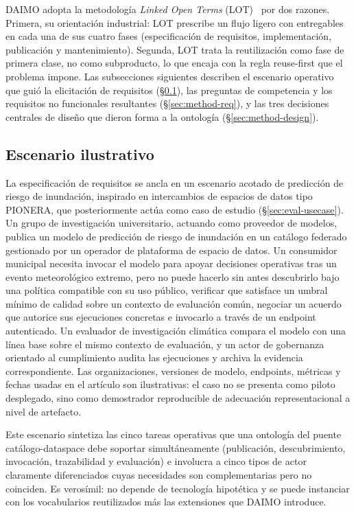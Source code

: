 \documentclass[Afour,sagev,times]{sagej}
\begin{document}
DAIMO adopta la metodología \emph{Linked Open Terms} (LOT)~\cite{lot22} por dos razones. Primera, su orientación industrial: LOT prescribe un flujo ligero con entregables en cada una de sus cuatro fases (especificación de requisitos, implementación, publicación y mantenimiento). Segunda, LOT trata la reutilización como fase de primera clase, no como subproducto, lo que encaja con la regla reuse-first que el problema impone. Las subsecciones siguientes describen el escenario operativo que guió la elicitación de requisitos (§\ref{sec:scenario}), las preguntas de competencia y los requisitos no funcionales resultantes (§\ref{sec:method-req}), y las tres decisiones centrales de diseño que dieron forma a la ontología (§\ref{sec:method-design}).

\subsection{Escenario ilustrativo}\label{sec:scenario}

La especificación de requisitos se ancla en un escenario acotado de predicción de riesgo de inundación, inspirado en intercambios de espacios de datos tipo PIONERA, que posteriormente actúa como caso de estudio (§\ref{sec:eval-usecase}). Un grupo de investigación universitario, actuando como proveedor de modelos, publica un modelo de predicción de riesgo de inundación en un catálogo federado gestionado por un operador de plataforma de espacio de datos. Un consumidor municipal necesita invocar el modelo para apoyar decisiones operativas tras un evento meteorológico extremo, pero no puede hacerlo sin antes descubrirlo bajo una política compatible con su uso público, verificar que satisface un umbral mínimo de calidad sobre un contexto de evaluación común, negociar un acuerdo que autorice sus ejecuciones concretas e invocarlo a través de un endpoint autenticado. Un evaluador de investigación climática compara el modelo con una línea base sobre el mismo contexto de evaluación, y un actor de gobernanza orientado al cumplimiento audita las ejecuciones y archiva la evidencia correspondiente. Las organizaciones, versiones de modelo, endpoints, métricas y fechas usadas en el artículo son ilustrativas: el caso no se presenta como piloto desplegado, sino como demostrador reproducible de adecuación representacional a nivel de artefacto.

Este escenario sintetiza las cinco tareas operativas que una ontología del puente catálogo-dataspace debe soportar simultáneamente (publicación, descubrimiento, invocación, trazabilidad y evaluación) e involucra a cinco tipos de actor claramente diferenciados cuyas necesidades son complementarias pero no coinciden. Es verosímil: no depende de tecnología hipotética y se puede instanciar con los vocabularios reutilizados más las extensiones que DAIMO introduce.
\end{document}
